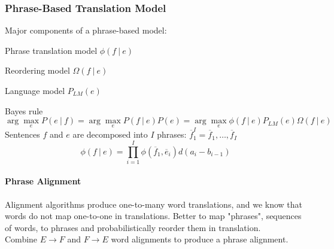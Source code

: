 \documentclass[10pt]{report}
\begin{document}
\subsubsection{Phrase-Based Translation Model}
Major components of a phrase-based model:
\begin{list}{}{}
	\item Phrase translation model $\phi(f\:|\:e)$
	\item Reordering model $\Omega(f\:|\:e)$
	\item Language model $P_{LM}(e)$
\end{list}
Bayes rule
$$\arg\max_e P(e\:|\:f) = \arg\max_e P(f\:|\:e)P(e) = \arg\max_e\phi(f\:|\:e)P_{LM}(e)\Omega(f\:|\:e)$$
Sentences $f$ and $e$ are decomposed into $I$ phrases: $\overline{f}_1^I = \overline{f}_1,\ldots,\overline{f}_I$
$$\phi(f\:|\:e)=\prod_{i=1}^I\phi(\overline{f}_1,\overline{e}_i)d(a_i-b_{i-1})$$
\paragraph{Phrase Alignment} Alignment algorithms produce one-to-many word translations, and we know that words do not map one-to-one in translations. Better to map "phrases", sequences of words, to phrases and probabilistically reorder them in translation.\\
Combine $E\rightarrow F$ and $F\rightarrow E$ word alignments to produce a phrase alignment.
\end{document}
